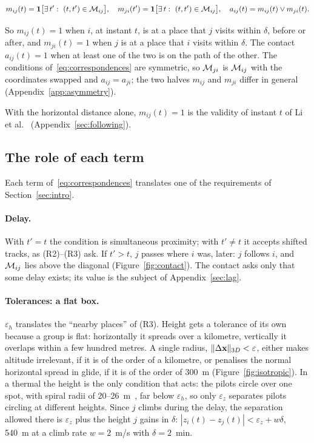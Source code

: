 \begin{definition}[contact]\label{def:contact}
\begin{equation}\label{eq:contact}
  m_{ij}(t) = \mathbf{1}\bigl[\exists\, t':\ (t,t')\in\mathcal{M}_{ij}\bigr],\quad
  m_{ji}(t') = \mathbf{1}\bigl[\exists\, t:\ (t,t')\in\mathcal{M}_{ij}\bigr],\quad
  a_{ij}(t) = m_{ij}(t)\vee m_{ji}(t).
\end{equation}
\end{definition}

So $m_{ij}(t)=1$ when $i$, at instant $t$, is at a place that $j$ visits within $\delta$, before
or after, and $m_{ji}(t)=1$ when $j$ is at a place that $i$ visits within $\delta$. The contact
$a_{ij}(t)=1$ when at least one of the two is on the path of the other. The conditions
of~\eqref{eq:correspondences} are symmetric, so $\mathcal{M}_{ji}$ is $\mathcal{M}_{ij}$ with the coordinates
swapped and $a_{ij}=a_{ji}$; the two halves $m_{ij}$ and $m_{ji}$ differ in general
(Appendix~\ref{app:asymmetry}).

With the horizontal distance alone, $m_{ij}(t)=1$ is the validity of instant $t$ of Li et
al.~\cite[§IV-A]{li2013} (Appendix~\ref{sec:following}).

\subsection{The role of each term}\label{sec:roles}

Each term of~\eqref{eq:correspondences} translates one of the requirements of
Section~\ref{sec:intro}.

\paragraph{Delay.} With $t'=t$ the condition is simultaneous proximity; with $t'\ne t$ it accepts
shifted tracks, as (R2)--(R3) ask. If $t'>t$, $j$ passes where $i$ was, later: $j$ follows $i$,
and $\mathcal{M}_{ij}$ lies above the diagonal (Figure~\ref{fig:contact}). The contact asks only that some
delay exists; its value is the subject of Appendix~\ref{sec:lag}.

\paragraph{Tolerances: a flat box.} $\varepsilon_h$ translates the ``nearby places'' of (R3).
Height gets a tolerance of its own because a group is flat: horizontally it spreads over a
kilometre, vertically it overlaps within a few hundred metres. A single radius,
$\|\Delta\mathbf{x}\|_{3D}<\varepsilon$, either makes altitude irrelevant, if it is of the order of a
kilometre, or penalises the normal horizontal spread in glide, if it is of the order of 300~m
(Figure~\ref{fig:isotropic}). In a thermal the height is the only condition that acts: the pilots
circle over one spot, with spiral radii of 20--26~m~\cite{akos2008}, far below $\varepsilon_h$, so
only $\varepsilon_z$ separates pilots circling at different heights. Since $j$ climbs during the
delay, the separation allowed there is $\varepsilon_z$ plus the height $j$ gains in $\delta$:
$|z_i(t)-z_j(t)|<\varepsilon_z+w\delta$, 540~m at a climb rate $w=2$~m/s with $\delta=2$~min.

